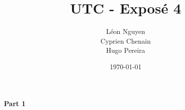 \documentclass[a4paper,12pt]{article}
\title{UTC - Exposé 4}
\author{Léon Nguyen \\ Cyprien Chenain \\ Hugo Pereira}
\date{\today}
\begin{document}
\titrearticle

\textbf{Part 1}

\lipsum[1] \\
\end{document}

